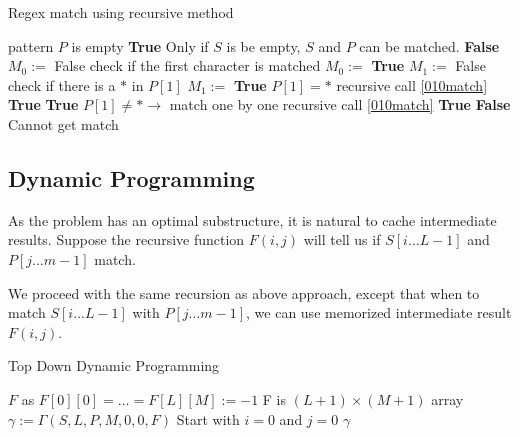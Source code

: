\setcounter{algorithm}{0}
\begin{algorithm}[H]
\caption{Regex match using recursive method}
\begin{algorithmic}[1]
 \Comment pattern $P$ is empty
\State \Return \textbf{\color{red}True} \Comment Only if $S$ is be empty, $S$ and $P$ can be matched.
\Else
\State \Return \textbf{False}
\EndIf
\EndIf
\State $M_{0} :=$ False 
 \Comment check if the first character is matched
\State $M_{0} :=$ \textbf{\color{red}True}
\EndIf
\State $M_{1} :=$ False
 \Comment check if there is a $\ast$ in $P[1]$
\State $M_{1} :=$ \textbf{\color{red}True}
\EndIf
{} \Comment $P[1] = \ast$
 \Comment recursive call \ref{010match}
\State \Return \textbf{True} 
\State \Return \textbf{True} 
\EndIf
\Else \Comment $P[1] \neq \ast \rightarrow$ match one by one
 \Comment recursive call \ref{010match}
\State \Return \textbf{True}
\EndIf
\EndIf
\State \Return \textbf{False} \Comment Cannot get match
\EndProcedure
\end{algorithmic}
\end{algorithm}

\subsection{Dynamic Programming}
As the problem has an optimal substructure, it is natural to cache intermediate results. Suppose the recursive function $F(i, j)$ will tell us if $S[i\ldots L-1]$ and $P[j\ldots m-1]$ match.
\par
We proceed with the same recursion as above approach, except that when to match $S[i\ldots L-1]$ with $P[j\ldots m-1]$, we can use memorized intermediate result $F(i, j)$.
\begin{algorithm}[H]
\caption{Top Down Dynamic Programming}
\begin{algorithmic}[1]
\State $F$ as $F[0][0] = \ldots = F[L][M]:=-1$ \Comment F is $(L+1)\times(M+1)$ array
\State $\gamma:=\Gamma(S, L, P, M, 0, 0, F)$ \Comment Start with $i=0$ and $j=0$
\State \Return $\gamma$
\EndProcedure
\end{algorithmic}
\end{algorithm}

